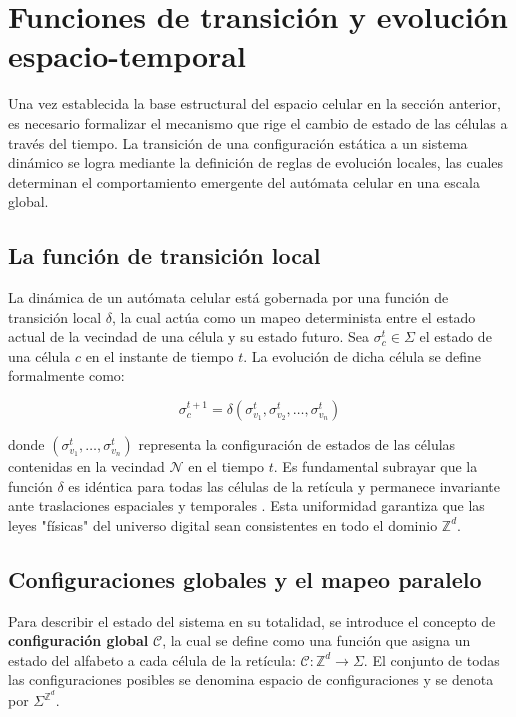\section{Funciones de transición y evolución espacio-temporal}
\label{sec:funciones_transicion}

Una vez establecida la base estructural del espacio celular en la sección anterior, es necesario formalizar el mecanismo que rige el cambio de estado de las células a través del tiempo. La transición de una configuración estática a un sistema dinámico se logra mediante la definición de reglas de evolución locales, las cuales determinan el comportamiento emergente del autómata celular en una escala global.

\subsection{La función de transición local}

La dinámica de un autómata celular está gobernada por una función de transición local $\delta$, la cual actúa como un mapeo determinista entre el estado actual de la vecindad de una célula y su estado futuro. Sea $\sigma_c^t \in \Sigma$ el estado de una célula $c$ en el instante de tiempo $t$. La evolución de dicha célula se define formalmente como:

\begin{equation}
    \sigma_c^{t+1} = \delta(\sigma_{v_1}^t, \sigma_{v_2}^t, \dots, \sigma_{v_n}^t)
\end{equation}

donde $(\sigma_{v_1}^t, \dots, \sigma_{v_n}^t)$ representa la configuración de estados de las células contenidas en la vecindad $\mathcal{N}$ en el tiempo $t$. Es fundamental subrayar que la función $\delta$ es idéntica para todas las células de la retícula y permanece invariante ante traslaciones espaciales y temporales \cite{Kari2005}. Esta uniformidad garantiza que las leyes "físicas" del universo digital sean consistentes en todo el dominio $\mathbb{Z}^d$.

\subsection{Configuraciones globales y el mapeo paralelo}

Para describir el estado del sistema en su totalidad, se introduce el concepto de \textbf{configuración global} $\mathcal{C}$, la cual se define como una función que asigna un estado del alfabeto a cada célula de la retícula: $\mathcal{C}: \mathbb{Z}^d \to \Sigma$. El conjunto de todas las configuraciones posibles se denomina espacio de configuraciones y se denota por $\Sigma^{\mathbb{Z}^d}$.

